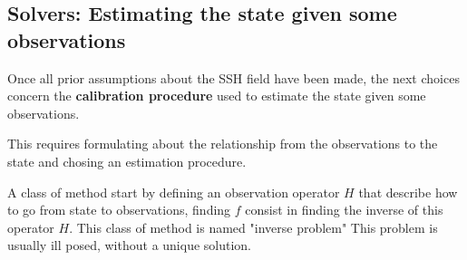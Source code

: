 \begin{bibunit}[IEEEtran.bst]



\section{Solvers: Estimating the state given some observations}

Once all prior assumptions about the SSH field have been made, the next choices concern the \textbf{calibration procedure} used to estimate the state given some observations.

This requires formulating about the relationship from the observations to the state and chosing an estimation procedure.

A class of method start by defining an observation operator $H$ that describe how to go from state to observations, finding $f$ consist in finding the inverse of this operator $H$. This class of method is named "inverse problem"
This problem is usually ill posed, without a unique solution.


\end{bibunit}
